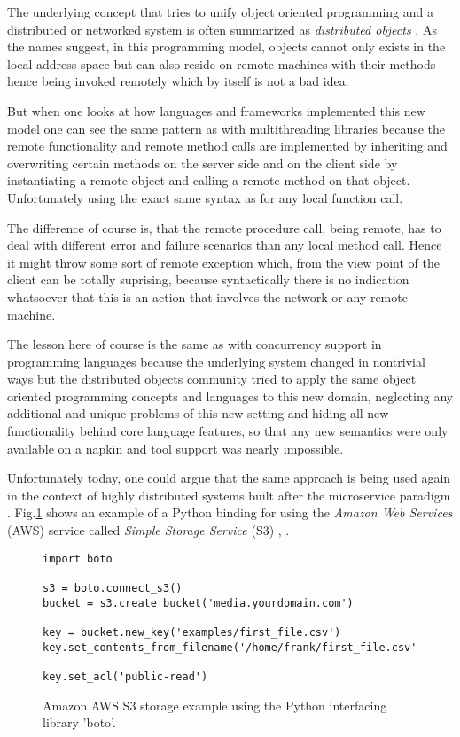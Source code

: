 The underlying concept that tries to unify object oriented programming
and a distributed or networked system is often summarized as
\textit{distributed objects} \cite{distobjects}. As the names suggest,
in this programming model, objects cannot only exists in the local
address space but can also reside on remote machines with their
methods hence being invoked remotely which by itself is not a bad idea.

But when one looks at how languages and frameworks implemented
this new model one can see the same pattern as with multithreading
libraries because the remote functionality and remote method calls are
implemented by inheriting and overwriting certain methods on the server
side and on the client side by instantiating a remote object and calling
a remote method on that object. Unfortunately using the exact same
syntax as for any local function call.

The difference of course is, that the remote procedure call, being remote,
has to deal with different error and failure scenarios than any local
method call. Hence it might throw some sort of remote exception which,
from the view point of the client can be totally suprising, because
syntactically there is no indication whatsoever that this is an action
that involves the network or any remote machine.

The lesson here of course is the same as with concurrency support in
programming languages because the underlying system changed in nontrivial
ways but the distributed objects community tried to apply the same
object oriented programming concepts and languages to this new domain,
neglecting any additional and unique problems of this new setting and
hiding all new functionality behind core language features, so that
any new semantics were only available on a napkin and tool support
was nearly impossible.
\newline

Unfortunately today, one could argue that the same approach is being
used again in the context of highly distributed systems built after
the microservice paradigm \cite{microservices}. Fig.\ref{pys3} shows
an example of a Python binding for using the
\textit{Amazon Web Services} (AWS)
service called \textit{Simple Storage Service} (S3) \cite{aws}, \cite{aws-s3}.

\begin{figure}[h]
    \begin{lstlisting}
import boto

s3 = boto.connect_s3()
bucket = s3.create_bucket('media.yourdomain.com')

key = bucket.new_key('examples/first_file.csv')
key.set_contents_from_filename('/home/frank/first_file.csv')

key.set_acl('public-read')
    \end{lstlisting}
  \caption{Amazon AWS S3 storage example using the Python interfacing
          library 'boto'.}
  \label{pys3}
\end{figure}

